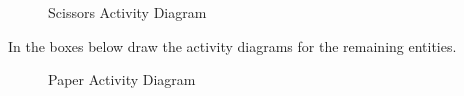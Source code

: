 \documentclass[
  10pt,
  a4paperpaper,
  DIV=11,
  numbers=noendperiod,
  oneside]{scrreprt}
\begin{document}
\begin{figure}[htbp]


\caption{\label{fig-scissors_act}Scissors Activity Diagram}

\end{figure}%

\newpage{}

In the boxes below draw the activity diagrams for the remaining
entities.

\begin{figure}[htbp]


\caption{\label{fig-paper_act}Paper Activity Diagram}

\end{figure}%
\end{document}
